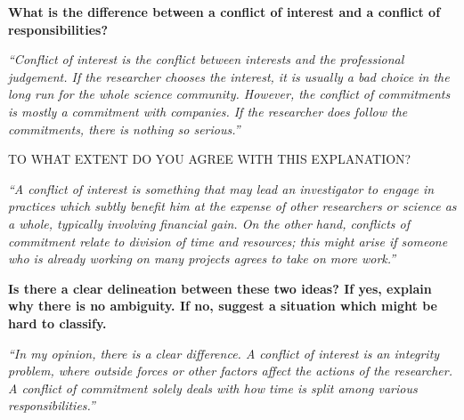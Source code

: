 \documentclass[portrait,11pt]{seminar}
\begin{document}


\bs 
{\bf What is the difference between a conflict of interest and a conflict of responsibilities? 
}

{\it ``Conflict of interest is the conflict between interests and the professional judgement. If the researcher chooses the interest, it is usually a bad choice in the long run for the whole science community. However, the conflict of commitments is mostly a commitment with companies. If the researcher does follow the commitments, there is nothing so serious.''}

\medskip

TO WHAT EXTENT DO YOU AGREE WITH THIS EXPLANATION?



\es 

\bs
{\it ``A conflict of interest is something that may lead an investigator to engage in practices which subtly benefit him at the expense of other researchers or science as a whole, typically involving financial gain. On the other hand, conflicts of commitment relate to division of time and resources; this might arise if someone who is already working on many projects agrees to take on more work.''}

\es

\bs 
{\bf 
Is there a clear delineation between these two ideas? If yes, explain why there is no ambiguity. If no, suggest a situation which might be hard to classify.
}

{\it  ``In my opinion, there is a clear difference. A conflict of interest is an integrity problem, where outside forces or other factors affect the actions of the researcher. A conflict of commitment solely deals with how time is split among various responsibilities.''}


\end{document}
